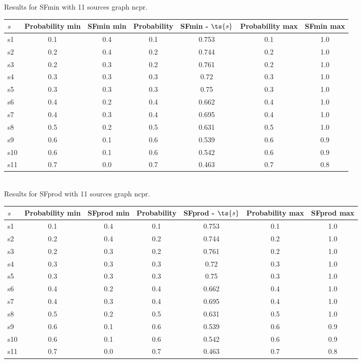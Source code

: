 \documentclass{article}
\begin{document}
\noindent Results for SFmin with 11 sources graph ncpr.

\noindent\begin{tabular}{|l|c|c|c|c|c|c|}
\hline
$s$& Probability min & SFmin min & Probability & SFmin - $\ts{s}$ & Probability max & SFmin max\\
\hline
s1 &0.1 & 0.4 & 0.1 & 0.753 & 0.1 & 1.0\\
\hline
s2 &0.2 & 0.4 & 0.2 & 0.744 & 0.2 & 1.0\\
\hline
s3 &0.2 & 0.3 & 0.2 & 0.761 & 0.2 & 1.0\\
\hline
s4 &0.3 & 0.3 & 0.3 & 0.72 & 0.3 & 1.0\\
\hline
s5 &0.3 & 0.3 & 0.3 & 0.75 & 0.3 & 1.0\\
\hline
s6 &0.4 & 0.2 & 0.4 & 0.662 & 0.4 & 1.0\\
\hline
s7 &0.4 & 0.3 & 0.4 & 0.695 & 0.4 & 1.0\\
\hline
s8 &0.5 & 0.2 & 0.5 & 0.631 & 0.5 & 1.0\\
\hline
s9 &0.6 & 0.1 & 0.6 & 0.539 & 0.6 & 0.9\\
\hline
s10 &0.6 & 0.1 & 0.6 & 0.542 & 0.6 & 0.9\\
\hline
s11 &0.7 & 0.0 & 0.7 & 0.463 & 0.7 & 0.8\\
\hline
\end{tabular}\\

\noindent Results for SFprod with 11 sources graph ncpr.

\noindent\begin{tabular}{|l|c|c|c|c|c|c|}
\hline
$s$& Probability min & SFprod min & Probability & SFprod - $\ts{s}$ & Probability max & SFprod max\\
\hline
s1 &0.1 & 0.4 & 0.1 & 0.753 & 0.1 & 1.0\\
\hline
s2 &0.2 & 0.4 & 0.2 & 0.744 & 0.2 & 1.0\\
\hline
s3 &0.2 & 0.3 & 0.2 & 0.761 & 0.2 & 1.0\\
\hline
s4 &0.3 & 0.3 & 0.3 & 0.72 & 0.3 & 1.0\\
\hline
s5 &0.3 & 0.3 & 0.3 & 0.75 & 0.3 & 1.0\\
\hline
s6 &0.4 & 0.2 & 0.4 & 0.662 & 0.4 & 1.0\\
\hline
s7 &0.4 & 0.3 & 0.4 & 0.695 & 0.4 & 1.0\\
\hline
s8 &0.5 & 0.2 & 0.5 & 0.631 & 0.5 & 1.0\\
\hline
s9 &0.6 & 0.1 & 0.6 & 0.539 & 0.6 & 0.9\\
\hline
s10 &0.6 & 0.1 & 0.6 & 0.542 & 0.6 & 0.9\\
\hline
s11 &0.7 & 0.0 & 0.7 & 0.463 & 0.7 & 0.8\\
\hline
\end{tabular}\\
\end{document}
